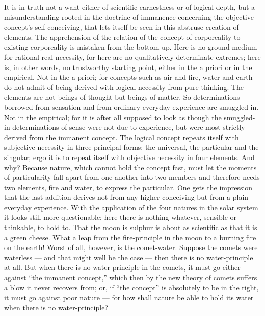 \documentclass[12pt,a4paper]{book}
\begin{document}
It is in truth not a want either of scientific earnestness or of logical depth, but a misunderstanding rooted in the
doctrine of immanence concerning the objective concept's self-conceiving, that lets itself be seen in this abstruse
creation of elements. The apprehension of the relation of the concept of corporeality to existing corporeality is
mistaken from the bottom up. Here is no ground-medium for rational-real necessity, for here are no qualitatively
determinate extremes; here is, in other words, no trustworthy starting point, either in the a priori or in the
empirical. Not in the a priori; for concepts such as air and fire, water and earth do not admit of being derived with
logical necessity from pure thinking. The elements are not beings of thought but beings of matter. So determinations
borrowed from sensation and from ordinary everyday experience are smuggled in. Not in the empirical; for
it is after all supposed to look as though the smuggled-in determinations of sense were not due to experience, but were
most strictly derived from the immanent concept. The logical concept repeats itself with subjective necessity in three
principal forms: the universal, the particular and the singular; ergo it is to repeat itself with objective necessity in
four elements. And why? Because nature, which cannot hold the concept fast, must let the moments of particularity fall
apart from one another into two members and therefore needs two elements, fire and water, to express the particular. One
gets the impression that the last addition derives not from any higher conceiving but from a plain everyday experience.
With the application of the four natures in the solar system it looks still more questionable; here there is nothing
whatever, sensible or thinkable, to hold to. That the moon is sulphur is about as scientific as that it is a green
cheese. What a leap from the fire-principle in the moon to a burning fire on the earth! Worst of all, however, is the
comet-water. Suppose the comets were waterless --- and that might well be the case --- then there is no water-principle
at all. But when there is no water-principle in the comets, it must go either against ``the immanent concept,'' which
then by the new theory of comets suffers a blow it never recovers from; or, if ``the concept'' is absolutely to be in the
right, it must go against poor nature --- for how shall nature be able to hold its water when there is no water-principle?
\end{document}
